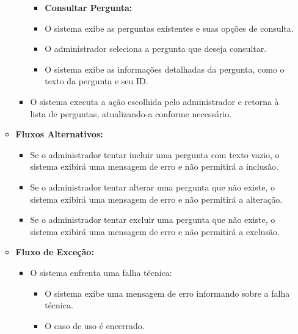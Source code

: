 \begin{itemize}
\begin{itemize}
\begin{itemize}
\begin{itemize}
                \item \textbf{Consultar Pergunta:}
                \item O sistema exibe as perguntas existentes e suas opções de consulta.
                \item O administrador seleciona a pergunta que deseja consultar.
                \item O sistema exibe as informações detalhadas da pergunta, como o texto da pergunta e seu ID.
            \end{itemize}
            
            \item O sistema executa a ação escolhida pelo administrador e retorna à lista de perguntas, atualizando-a conforme necessário.
        \end{itemize}
        \item \textbf{Fluxos Alternativos:}
        \begin{itemize}
            \item Se o administrador tentar incluir uma pergunta com texto vazio, o sistema exibirá uma mensagem de erro e não permitirá a inclusão.
            \item Se o administrador tentar alterar uma pergunta que não existe, o sistema exibirá uma mensagem de erro e não permitirá a alteração.
            \item Se o administrador tentar excluir uma pergunta que não existe, o sistema exibirá uma mensagem de erro e não permitirá a exclusão.
        \end{itemize}
        \item \textbf{Fluxo de Exceção:}
        \begin{itemize}
            \item O sistema enfrenta uma falha técnica:
            \begin{itemize}
                \item O sistema exibe uma mensagem de erro informando sobre a falha técnica.
                \item O caso de uso é encerrado.
            \end{itemize}
        \end{itemize}
        
    \end{itemize}
\end{itemize}
